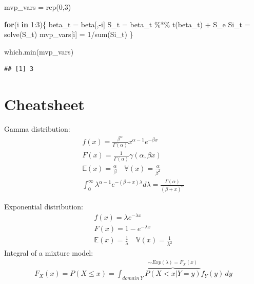 \documentclass[
  oneside]{book}
\newenvironment{Shaded}{\begin{snugshade}}{\end{snugshade}}
\newcommand{\ControlFlowTok}[1]{\textcolor[rgb]{0.13,0.29,0.53}{\textbf{#1}}}
\newcommand{\DecValTok}[1]{\textcolor[rgb]{0.00,0.00,0.81}{#1}}
\newcommand{\FunctionTok}[1]{\textcolor[rgb]{0.00,0.00,0.00}{#1}}
\newcommand{\NormalTok}[1]{#1}
\newcommand{\OtherTok}[1]{\textcolor[rgb]{0.56,0.35,0.01}{#1}}
\newcommand{\SpecialCharTok}[1]{\textcolor[rgb]{0.00,0.00,0.00}{#1}}
\begin{document}
\begin{Shaded}
\begin{Highlighting}[]
\NormalTok{mvp\_vars }\OtherTok{=} \FunctionTok{rep}\NormalTok{(}\DecValTok{0}\NormalTok{,}\DecValTok{3}\NormalTok{)}

\ControlFlowTok{for}\NormalTok{(i }\ControlFlowTok{in} \DecValTok{1}\SpecialCharTok{:}\DecValTok{3}\NormalTok{)\{}
\NormalTok{  beta\_t }\OtherTok{=}\NormalTok{ beta[,}\SpecialCharTok{{-}}\NormalTok{i]}
\NormalTok{  S\_t }\OtherTok{=}\NormalTok{ beta\_t }\SpecialCharTok{\%*\%} \FunctionTok{t}\NormalTok{(beta\_t) }\SpecialCharTok{+}\NormalTok{ S\_e}
\NormalTok{  Si\_t }\OtherTok{=} \FunctionTok{solve}\NormalTok{(S\_t)}
\NormalTok{  mvp\_vars[i] }\OtherTok{=} \DecValTok{1}\SpecialCharTok{/}\FunctionTok{sum}\NormalTok{(Si\_t)}
\NormalTok{\}}

\FunctionTok{which.min}\NormalTok{(mvp\_vars)}
\end{Highlighting}
\end{Shaded}

\begin{verbatim}
## [1] 3
\end{verbatim}

\hypertarget{cheatsheet}{%
\chapter{Cheatsheet}\label{cheatsheet}}

Gamma distribution:
\[
\begin{gathered}
{\displaystyle f(x)={\frac {\beta ^{\alpha }}{\Gamma (\alpha )}}x^{\alpha -1}e^{-\beta x}}\\
{\displaystyle F(x)={\frac {1}{\Gamma (\alpha )}}\gamma (\alpha ,\beta x)}\\
\mathbb{E}(x) = {\frac  {\alpha }{\beta }} \quad \mathbb{V}(x) = {\displaystyle {\frac {\alpha }{\beta ^{2}}}}\\
\int_0^{\infty} \lambda^{\alpha-1} e^{-(\beta+x) \lambda} d \lambda = \frac{\Gamma(\alpha)}{(\beta+x)^\alpha}
\end{gathered}
\]

Exponential distribution:
\[
\begin{gathered}
f(x) = \lambda e^{{-\lambda x}}\\
F(x) = {\displaystyle 1-e^{-\lambda x}}\\
\mathbb{E}(x) = \frac{1}{\lambda} \quad \mathbb{V}(x) = \frac{1}{\lambda^{2}}
\end{gathered}
\]
Integral of a mixture model:
\[
\begin{gathered}
F_{X}(x) = P(X\leq x) = \int_{domain \ Y} \overbrace{ P(X<x| Y = y) }^{ \sim Exp(\lambda) = F_{X}(x) }f_{Y}(y) \, dy 
\end{gathered}
\]
\end{document}
